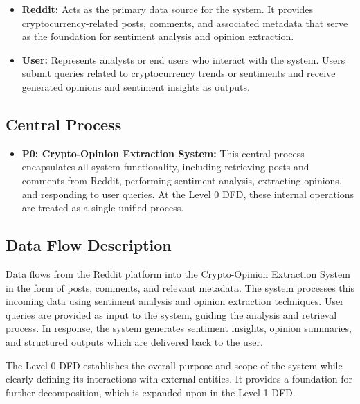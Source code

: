 \begin{itemize}
    \item \textbf{Reddit:} Acts as the primary data source for the system. It provides cryptocurrency-related posts, comments, and associated metadata that serve as the foundation for sentiment analysis and opinion extraction.
    \item \textbf{User:} Represents analysts or end users who interact with the system. Users submit queries related to cryptocurrency trends or sentiments and receive generated opinions and sentiment insights as outputs.
\end{itemize}

\subsection{Central Process}

\begin{itemize}
    \item \textbf{P0: Crypto-Opinion Extraction System:} This central process encapsulates all system functionality, including retrieving posts and comments from Reddit, performing sentiment analysis, extracting opinions, and responding to user queries. At the Level 0 DFD, these internal operations are treated as a single unified process.
\end{itemize}

\subsection{Data Flow Description}

Data flows from the Reddit platform into the Crypto-Opinion Extraction System in the form of posts, comments, and relevant metadata. The system processes this incoming data using sentiment analysis and opinion extraction techniques. User queries are provided as input to the system, guiding the analysis and retrieval process. In response, the system generates sentiment insights, opinion summaries, and structured outputs which are delivered back to the user.

The Level 0 DFD establishes the overall purpose and scope of the system while clearly defining its interactions with external entities. It provides a foundation for further decomposition, which is expanded upon in the Level 1 DFD.

